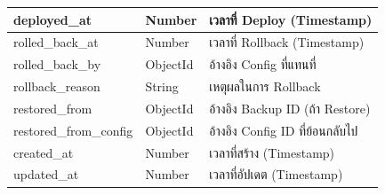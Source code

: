 \begin{table}[H]
\begin{tabularx}{\textwidth}{|l|l|X|}
        deployed\_at & Number & เวลาที่ Deploy (Timestamp) \\
        \hline
        rolled\_back\_at & Number & เวลาที่ Rollback (Timestamp) \\
        \hline
        rolled\_back\_by & ObjectId & อ้างอิง Config ที่แทนที่ \\
        \hline
        rollback\_reason & String & เหตุผลในการ Rollback \\
        \hline
        restored\_from & ObjectId & อ้างอิง Backup ID (ถ้า Restore) \\
        \hline
        restored\_from\_config & ObjectId & อ้างอิง Config ID ที่ย้อนกลับไป \\
        \hline
        created\_at & Number & เวลาที่สร้าง (Timestamp) \\
        \hline
        updated\_at & Number & เวลาที่อัปเดต (Timestamp) \\
        \hline
    \end{tabularx}
\end{table}


